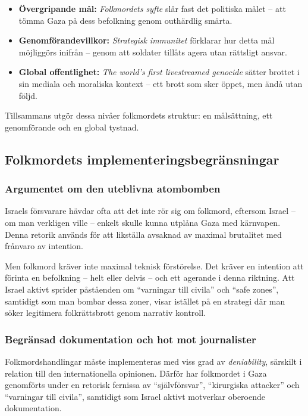 \documentclass[12pt]{article}
\begin{document}
\begin{itemize}
  \item \textbf{Övergripande mål:} \textit{Folkmordets syfte} slår fast det politiska målet – att tömma Gaza på dess befolkning genom outhärdlig smärta.
  
  \item \textbf{Genomförandevillkor:} \textit{Strategisk immunitet} förklarar hur detta mål möjliggörs inifrån – genom att soldater tillåts agera utan rättsligt ansvar.

  \item \textbf{Global offentlighet:} \textit{The world’s first livestreamed genocide} sätter brottet i sin mediala och moraliska kontext – ett brott som sker öppet, men ändå utan följd.
\end{itemize}

Tillsammans utgör dessa nivåer folkmordets struktur: en målsättning, ett genomförande och en global tystnad.



\subsection{Folkmordets implementeringsbegränsningar}

\subsubsection*{Argumentet om den uteblivna atombomben}
Israels försvarare hävdar ofta att det inte rör sig om folkmord, eftersom Israel – om man verkligen ville – enkelt skulle kunna utplåna Gaza med kärnvapen. Denna retorik används för att likställa avsaknad av maximal brutalitet med frånvaro av intention.

Men folkmord kräver inte maximal teknisk förstörelse. Det kräver en intention att förinta en befolkning – helt eller delvis – och ett agerande i denna riktning. Att Israel aktivt sprider påståenden om \enquote{varningar till civila} och \enquote{safe zones}, samtidigt som man bombar dessa zoner, visar istället på en strategi där man söker legitimera folkrättsbrott genom narrativ kontroll.

\subsubsection*{Begränsad dokumentation och hot mot journalister}
Folkmordshandlingar måste implementeras med viss grad av \textit{deniability}, särskilt i relation till den internationella opinionen. Därför har folkmordet i Gaza genomförts under en retorisk fernissa av \enquote{självförsvar}, \enquote{kirurgiska attacker} och \enquote{varningar till civila}, samtidigt som Israel aktivt motverkar oberoende dokumentation.
\end{document}
